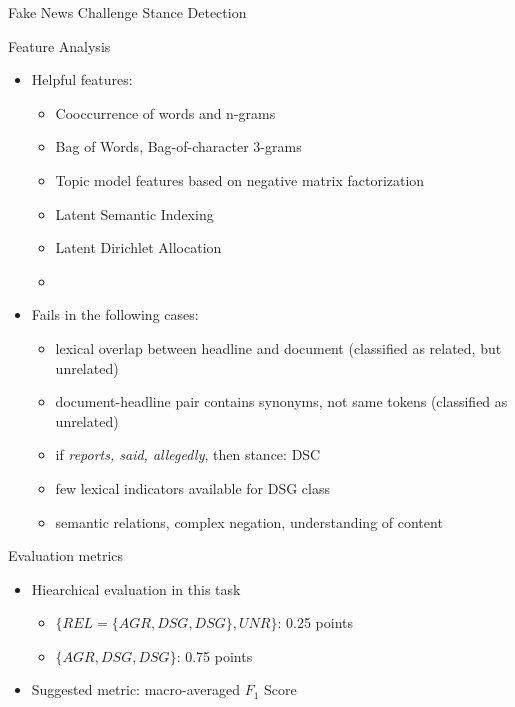 \documentclass[english,handout]{mlutalk}
\begin{document}
\begin{frame}[allowframebreaks]{Fake News Challenge Stance Detection~\cite{HanselowskiSSCC2018}}
  \framebreak

  \begin{block}{Feature Analysis}
    \begin{itemize}
        \item Helpful features:
        \begin{itemize}
            \item Cooccurrence of words and n-grams
            \item Bag of Words, Bag-of-character 3-grams
            \item Topic model features based on negative matrix factorization
            \item Latent Semantic Indexing
            \item Latent Dirichlet Allocation
            \item 
        \end{itemize}
        \item Fails in the following cases:
          \begin{itemize}
              \item lexical overlap between headline and document (classified as related, but unrelated)
              \item document-headline pair contains synonyms, not same tokens (classified as unrelated)
              \item if \textit{reports, said, allegedly}, then stance: DSC
              \item few lexical indicators available for DSG class
              \item semantic relations, complex negation, understanding of content
          \end{itemize}
    \end{itemize}
  \end{block}
    
    \framebreak
    \begin{block}[]
      
    \end{block}
    \begin{block}{Evaluation metrics}
      \begin{itemize}
          \item Hiearchical evaluation in this task
            \begin{itemize}
                \item $\{ REL=\{AGR, DSG, DSG\}, UNR\}$: 0.25 points
                \item $\{AGR, DSG, DSG\}$: 0.75 points
            \end{itemize}
          \item Suggested metric: macro-averaged $F_1$ Score 
      \end{itemize}
    \end{block}
\end{frame}
\end{document}
